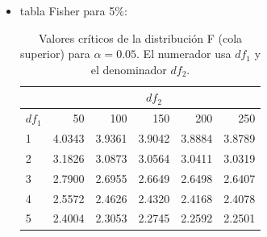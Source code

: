 \documentclass[10pt,a4paper]{article}
\begin{document}
\begin{itemize}
\item tabla Fisher para 5\%:
\begin{table}[H]
\centering
\caption{Valores críticos de la distribución F (cola superior) para $\alpha=0.05$. 
El numerador usa $df_1$ y el denominador $df_2$.}
\label{tab:Fcrit_5pct}
\begin{tabular}{|l|r|r|r|r|r|}
\toprule
\hline
& \multicolumn{5}{c|}{$df_2$} \\
\hline
$df_1$ & 50 & 100 & 150 & 200 & 250 \\
\hline
\midrule
1 & 4.0343 & 3.9361 & 3.9042 & 3.8884 & 3.8789 \\
\hline
2 & 3.1826 & 3.0873 & 3.0564 & 3.0411 & 3.0319 \\
\hline
3 & 2.7900 & 2.6955 & 2.6649 & 2.6498 & 2.6407 \\
\hline
4 & 2.5572 & 2.4626 & 2.4320 & 2.4168 & 2.4078 \\
\hline
5 & 2.4004 & 2.3053 & 2.2745 & 2.2592 & 2.2501 \\
\hline
\bottomrule
\end{tabular}
\end{table}

\end{itemize}
\end{document}
